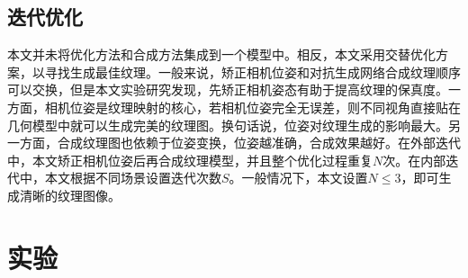 \subsection{迭代优化}

本文并未将优化方法和合成方法集成到一个模型中。相反，本文采用交替优化方案，以寻找生成最佳纹理。一般来说，矫正相机位姿和对抗生成网络合成纹理顺序可以交换，但是本文实验研究发现，先矫正相机姿态有助于提高纹理的保真度。一方面，相机位姿是纹理映射的核心，若相机位姿完全无误差，则不同视角直接贴在几何模型中就可以生成完美的纹理图。换句话说，位姿对纹理生成的影响最大。另一方面，合成纹理图也依赖于位姿变换，位姿越准确，合成效果越好。在外部迭代中，本文矫正相机位姿后再合成纹理模型，并且整个优化过程重复$N$次。在内部迭代中，本文根据不同场景设置迭代次数$S$。一般情况下，本文设置$N \le 3$，即可生成清晰的纹理图像。

\section{实验}
